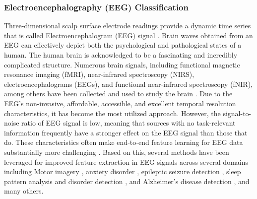 \documentclass[preprint,12pt]{elsarticle}
\begin{document}
\subsubsection{Electroencephalography (EEG) Classification}
Three-dimensional scalp surface electrode readings provide a dynamic time series that is called Electroencephalogram (EEG) signal \citep{Schirrmeister2017}. Brain waves obtained from an  EEG can effectively depict both the psychological and pathological states of a human. The human brain is acknowledged to be a fascinating and incredibly complicated structure. Numerous brain signals, including functional magnetic resonance imaging (fMRI), near-infrared spectroscopy (NIRS), electroencephalograms (EEGs), and functional near-infrared spectroscopy (fNIR), among others have been collected and used to study the brain \citep{gao2021complex}. Due to the EEG's non-invasive, affordable, accessible, and excellent temporal resolution characteristics, it has become the most utilized approach. However, the signal-to-noise ratio of EEG signal is low, meaning that sources with no task-relevant information frequently have a stronger effect on the EEG signal than those that do. These characteristics often make end-to-end feature learning for EEG data substantially more challenging \citep{Schirrmeister2017}. Based on this, several methods have been leveraged for improved feature extraction in EEG signals across several domains including Motor imagery \citep{Ang7802578}, anxiety disorder \citep{shen2022aberrated}, epileptic seizure detection \citep{boonyaki2020}, sleep pattern analysis and disorder detection \citep{sharma2021automated, vaquerizo2023explainable}, and Alzheimer's disease detection \citep{modir2023systematic}, and many others.
\end{document}
